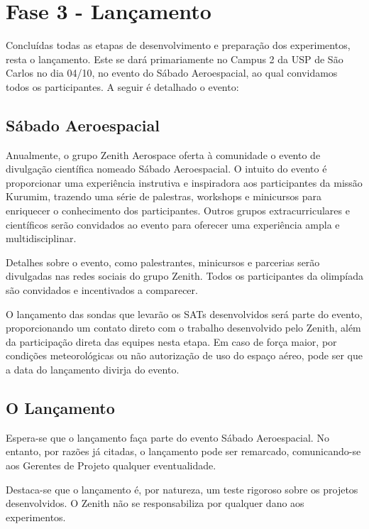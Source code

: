 \section{Fase 3 - Lançamento}\label{sec:lancamento}
    \par Concluídas todas as etapas de desenvolvimento e preparação dos experimentos, 
    resta o lançamento. Este se dará primariamente no Campus 2 da USP de São Carlos no 
    dia 04/10, no evento do Sábado Aeroespacial, ao qual convidamos todos os participantes.
    A seguir é detalhado o evento:    

    \subsection{Sábado Aeroespacial}\label{sec:sabado_aeroespacial}
        Anualmente, o grupo Zenith Aerospace oferta à comunidade o evento de divulgação científica nomeado Sábado Aeroespacial. O intuito do evento é proporcionar uma experiência instrutiva e inspiradora aos participantes da missão Kurumim, trazendo uma série de palestras, workshops e minicursos para enriquecer o conhecimento dos participantes. Outros grupos extracurriculares e científicos serão convidados ao evento para oferecer uma experiência ampla e multidisciplinar.

        Detalhes sobre o evento, como palestrantes, minicursos e parcerias serão divulgadas nas redes sociais do grupo Zenith. Todos os participantes da olimpíada são convidados e incentivados a comparecer.
        
        O lançamento das sondas que levarão os SATs desenvolvidos será parte do evento, proporcionando um contato direto com o trabalho desenvolvido pelo Zenith, além da participação direta das equipes nesta etapa. Em caso de força maior, por condições meteorológicas ou não autorização de uso do espaço aéreo, pode ser que a data do lançamento divirja do evento.

    \subsection{O Lançamento}\label{sec:lançamento}
        Espera-se que o lançamento faça parte do evento Sábado Aeroespacial. No entanto, por razões já citadas, o lançamento pode ser remarcado, comunicando-se aos Gerentes de Projeto qualquer eventualidade.

        Destaca-se que o lançamento é, por natureza, um teste rigoroso sobre os projetos desenvolvidos. O Zenith não se responsabiliza por qualquer dano aos experimentos.
